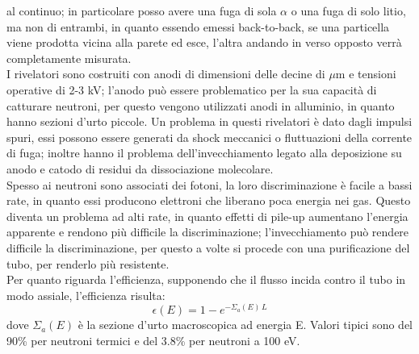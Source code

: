 al continuo; in particolare posso avere una fuga di sola $\alpha$ o una fuga di solo litio, ma non di entrambi, in quanto essendo emessi
back-to-back, se una particella viene prodotta vicina alla parete ed esce, l'altra andando in verso opposto verr\`a completamente misurata.\\
I rivelatori sono costruiti con anodi di dimensioni delle decine di $\mu$m e tensioni operative di 2-3 kV;
l'anodo pu\`o essere problematico per la sua capacit\`a di catturare neutroni, per questo vengono utilizzati anodi in alluminio, in quanto hanno
sezioni d'urto piccole.
Un problema in questi rivelatori \`e dato dagli impulsi spuri, essi possono essere generati da shock meccanici o fluttuazioni della corrente di fuga; inoltre hanno il problema dell'invecchiamento legato alla deposizione su anodo e catodo di residui da dissociazione molecolare.\\
Spesso ai neutroni sono associati dei fotoni, la loro discriminazione \`e facile a bassi rate, in quanto essi producono elettroni che liberano poca energia nei gas.
Questo diventa un problema ad alti rate, in quanto effetti di pile-up aumentano l'energia apparente e rendono pi\`u difficile la discriminazione;
l'invecchiamento pu\`o rendere difficile la discriminazione, per questo a volte si procede con una purificazione del tubo, per renderlo pi\`u resistente.\\
Per quanto riguarda l'efficienza, supponendo che il flusso incida contro il tubo in modo assiale, l'efficienza risulta:
\begin{equation*}
\epsilon(E) = 1 - e^{-\Sigma_a(E)\,L}
\end{equation*}
dove $\Sigma_a(E)$ \`e la sezione d'urto macroscopica ad energia E.
Valori tipici sono del 90\% per neutroni termici e del 3.8\% per neutroni a 100 eV.
